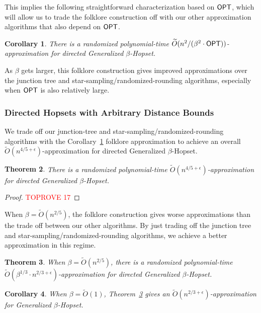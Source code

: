 \documentclass{article}
\newtheorem{theorem}{Theorem}[section]
\newtheorem{corollary}[theorem]{Corollary}
\theoremstyle{definition}
\theoremstyle{remark}
\def\be    {\beta}
\def\opt {{\sf OPT}}
\def\hopset {{\sc Generalized $\beta$-Hopset}}
\begin{document}
This implies the following straightforward characterization based on $\opt$, which will allow us to trade the folklore construction off with our other approximation algorithms that also depend on $\opt$.

\begin{corollary} \label{cor:existential_folklore}
    There is a randomized polynomial-time $\widetilde{O}(n^2/ (\beta^2 \cdot \opt))$-approximation for directed {\hopset}.
\end{corollary}

As $\be$ gets larger, this folklore construction gives improved approximations over the junction tree and star-sampling/randomized-rounding algorithms, especially when $\opt$ is also relatively large. 


\subsubsection{Directed Hopsets with Arbitrary Distance Bounds}
We trade off our junction-tree and star-sampling/randomized-rounding algorithms with the Corollary~\ref{cor:existential_folklore} folklore approximation to achieve an overall $\widetilde{O}(n^{4/5 + \epsilon})$-approximation for directed {\hopset}. 

\begin{theorem} \label{thm:main_result}
    There is a randomized  polynomial-time $\widetilde{O}(n^{4/5 + \epsilon})$-approximation for directed {\hopset}.
\end{theorem}
\begin{proof}\textcolor{red}{TOPROVE 17}\end{proof}


When $\beta = \widetilde{O}(n^{2/5})$, the folklore construction gives worse approximations than the trade off between our other algorithms. By just trading off the junction tree and star-sampling/randomized-rounding algorithms, we achieve a better approximation in this regime.

\begin{theorem} \label{thm:small_be_dir_gen}
    When $\be = \widetilde{O}(n^{2/5})$, there is a randomized polynomial-time $\widetilde{O}(\be^{1/3} \cdot n^{2/3 + \epsilon})$-approximation for directed {\hopset}.
\end{theorem}
\begin{corollary}
    When $\be = \widetilde{O}(1)$, Theorem~\ref{thm:small_be_dir_gen} gives an $\widetilde{O}(n^{2/3 + \epsilon})$-approximation for {\hopset}.
\end{corollary}
\end{document}
